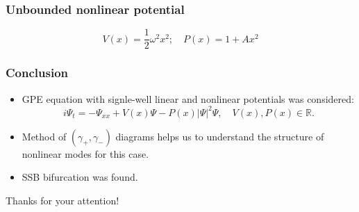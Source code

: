 \documentclass{beamer}
\begin{document}
\begin{frame}
\frametitle{Unbounded nonlinear potential}

$$V(x) = \dfrac{1}{2} \omega^2 x^2; \quad P(x) = 1 + A x^2$$

\begin{figure}
\label{pic:bifurcation_unbounded}
\end{figure}

\end{frame}


\begin{frame}
\frametitle{Conclusion}
\begin{itemize}
\item GPE equation with {\color{red} signle-well} linear and nonlinear potentials was considered:
$$i\Psi_t = -\Psi_{xx} + V(x) \Psi - P(x) |\Psi|^2 \Psi, \quad V(x), P(x) \in \mathbb{R}.$$
\item Method of $(\gamma_+, \gamma_-)$ diagrams helps us to understand the structure of nonlinear modes for this case.
\item SSB bifurcation was found. 
\end{itemize}
\end{frame}


\begin{frame}
\begin{figure}
\label{pic:publication}
\end{figure}

\end{frame}


\begin{frame}
\begin{center}
Thanks for your attention!
\end{center}
\end{frame}
\end{document}
